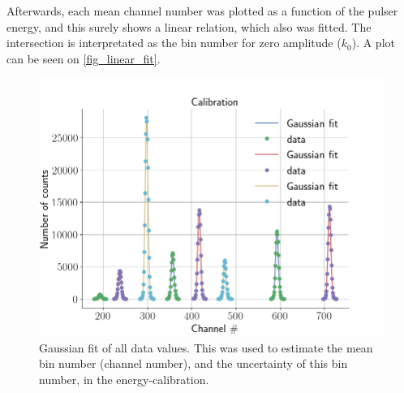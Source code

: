 Afterwards, each mean channel number was plotted as a function of the pulser
energy, and this surely shows a linear relation, which also was fitted. The
intersection is interpretated as the bin number for zero amplitude ($k_0$). A
plot can be seen on \cref{fig_linear_fit}.



\begin{figure}[h]
\centering
\includegraphics[width=0.99\columnwidth]{gaussian_fit}
\caption{Gaussian fit of all data values. This was used to estimate the mean
bin number (channel number), and the uncertainty of this bin number, in the
energy-calibration.}
\label{fig_gaussian_fit}
\end{figure}

